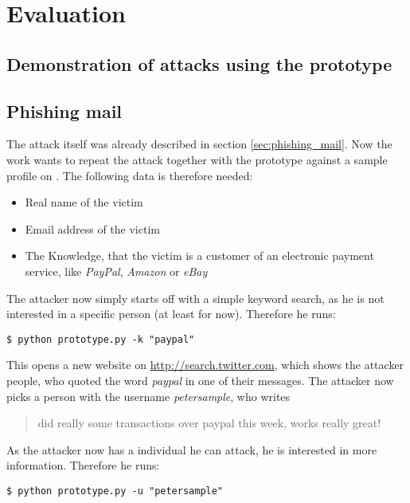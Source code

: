 \chapter{Evaluation}
\label{chapter:evaluation}

\section{Demonstration of attacks using the prototype}

\section{Phishing mail}

The attack itself was already described in section \ref{sec:phishing_mail}. Now
the work wants to repeat the attack together with the prototype against a
sample profile on \Twitter{}. The following data is therefore needed:

\begin{itemize}
  \item Real name of the victim
  \item Email address of the victim
  \item The Knowledge, that the victim is a customer of an electronic
  payment service, like \textit{PayPal}, \textit{Amazon} or \textit{eBay}
\end{itemize}

The attacker now simply starts off with a simple keyword search, as he is not
interested in a specific person (at least for now). Therefore he runs:

\lstset{language=bash}
\begin{lstlisting}
$ python prototype.py -k "paypal"
\end{lstlisting}

This opens a new website on \url{http://search.twitter.com}, which shows the
attacker people, who quoted the word \textit{paypal} in one of their messages.
The attacker now picks a person with the username \textit{petersample}, who writes

\begin{quote}
did really some transactions over paypal this week, works really great!
\end{quote}

As the attacker now has a individual he can attack, he is interested in more
information. Therefore he runs:

\lstset{language=bash}
\begin{lstlisting}
$ python prototype.py -u "petersample"
\end{lstlisting}

